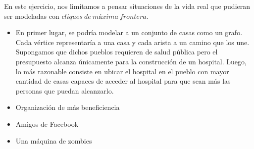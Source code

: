 En este ejercicio, nos limitamos a pensar situaciones de la vida real que pudieran ser modeladas con $cliques\ de\ máxima\ frontera$.
\begin{itemize}
\item En primer lugar, se podría modelar a un conjunto de casas como un grafo. Cada vértice representaría a una casa y cada arista a un camino que los une. Supongamos que dichos pueblos requieren de salud pública pero el presupuesto alcanza únicamente para la construcción de un hospital. Luego, lo más razonable consiste en ubicar el hospital en el pueblo con mayor cantidad de casas capaces de acceder al hospital para que sean más las personas que puedan alcanzarlo.

\item Organización de más beneficiencia

\item Amigos de Facebook

\item Una máquina de zombies
 
\end{itemize}
